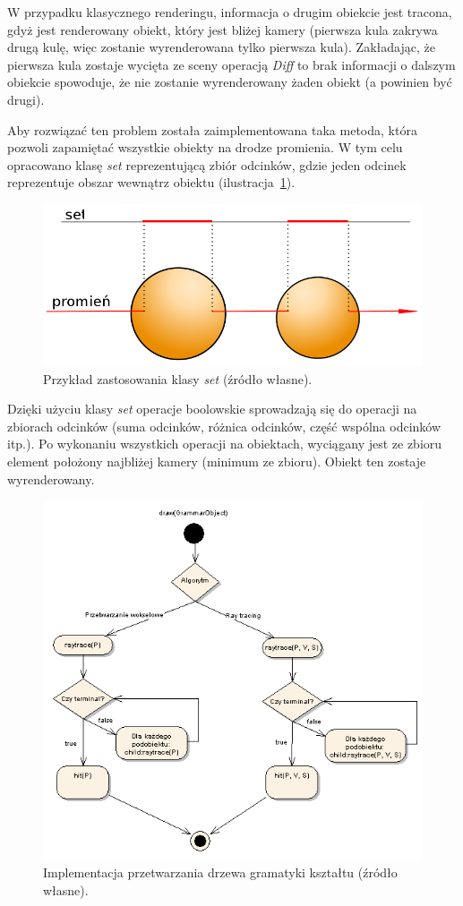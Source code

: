 W przypadku klasycznego renderingu, informacja o drugim obiekcie jest tracona,
gdyż jest renderowany obiekt, który jest bliżej kamery (pierwsza kula
zakrywa drugą kulę, więc zostanie wyrenderowana tylko pierwsza kula).
Zakładając, że pierwsza kula zostaje wycięta ze sceny operacją {\em Diff} to
brak informacji o dalszym obiekcie spowoduje, że nie zostanie wyrenderowany
żaden obiekt (a powinien być drugi).

Aby rozwiązać ten problem została zaimplementowana taka metoda, która pozwoli
zapamiętać wszystkie obiekty na drodze promienia. W tym celu opracowano klasę
{\em set} reprezentującą zbiór odcinków, gdzie jeden odcinek reprezentuje obszar
wewnątrz obiektu (ilustracja~\ref{ray_trace02}).

\begin{figure}[h]
  \centering
  \includegraphics[width=12cm]{images/ray_trace02.png}
  \caption{Przykład zastosowania klasy {\em set} (źródło własne).}
  \label{ray_trace02}
\end{figure}
Dzięki użyciu klasy {\em set} operacje boolowskie sprowadzają się do operacji na
zbiorach odcinków (suma odcinków, różnica odcinków, część wspólna odcinków
itp.). Po wykonaniu wszystkich operacji na obiektach, wyciągany jest ze zbioru
element położony najbliżej kamery (minimum ze zbioru). Obiekt ten zostaje
wyrenderowany.

\begin{figure}[h]
  \centering
  \includegraphics[width=12cm]{images/tree_traversal.PNG}
  \caption{Implementacja przetwarzania drzewa gramatyki kształtu (źródło
  własne).}
  \label{tree_traversal_algo}
\end{figure}

